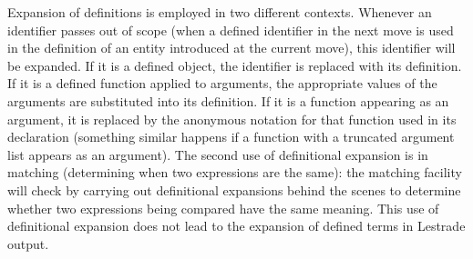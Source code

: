 \documentclass[12pt]{article}
\begin{document}
Expansion of definitions is employed in two different contexts.  Whenever an identifier passes out of scope (when a defined identifier in the next move is used in the definition of an entity introduced at the current move), this identifier will be expanded.  If it is a defined object, the identifier is replaced with its definition.
If it is a defined function applied to arguments, the appropriate values of the arguments are substituted into its definition.  If it is a function appearing as an argument, it is replaced by the anonymous notation for that function used in its declaration (something similar happens if a function with a truncated argument list appears as an argument).  The second use of definitional expansion is in matching (determining when two expressions are the same):  the matching facility will check by carrying out definitional expansions behind the scenes to determine whether two expressions being compared have the same meaning.  This use of definitional expansion does not lead to the expansion of defined terms in Lestrade output.
\end{document}
